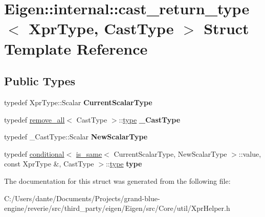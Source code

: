 \hypertarget{struct_eigen_1_1internal_1_1cast__return__type}{}\section{Eigen\+::internal\+::cast\+\_\+return\+\_\+type$<$ Xpr\+Type, Cast\+Type $>$ Struct Template Reference}
\label{struct_eigen_1_1internal_1_1cast__return__type}
\subsection*{Public Types}
\begin{DoxyCompactItemize}
\item 
\mbox{\label{struct_eigen_1_1internal_1_1cast__return__type_a596724bf517968c8384b050916a1a076}} 
typedef Xpr\+Type\+::\+Scalar {\bfseries Current\+Scalar\+Type}
\item 
\mbox{\label{struct_eigen_1_1internal_1_1cast__return__type_a1c9077977303cecc13d0069f58624662}} 
typedef \mbox{\hyperlink{struct_eigen_1_1internal_1_1remove__all}{remove\+\_\+all}}$<$ Cast\+Type $>$\+::\mbox{\hyperlink{struct_eigen_1_1internal_1_1true__type}{type}} {\bfseries \+\_\+\+Cast\+Type}
\item 
\mbox{\label{struct_eigen_1_1internal_1_1cast__return__type_aa13fd8b2e8fe3a4cdfc25b4f0961cbec}} 
typedef \+\_\+\+Cast\+Type\+::\+Scalar {\bfseries New\+Scalar\+Type}
\item 
\mbox{\label{struct_eigen_1_1internal_1_1cast__return__type_a317bf470ba15bfe4cdfc28991ef8302c}} 
typedef \mbox{\hyperlink{struct_eigen_1_1internal_1_1conditional}{conditional}}$<$ \mbox{\hyperlink{struct_eigen_1_1internal_1_1is__same}{is\+\_\+same}}$<$ Current\+Scalar\+Type, New\+Scalar\+Type $>$\+::value, const Xpr\+Type \&, Cast\+Type $>$\+::\mbox{\hyperlink{struct_eigen_1_1internal_1_1true__type}{type}} {\bfseries type}
\end{DoxyCompactItemize}


The documentation for this struct was generated from the following file\+:\begin{DoxyCompactItemize}
\item 
C\+:/\+Users/dante/\+Documents/\+Projects/grand-\/blue-\/engine/reverie/src/third\+\_\+party/eigen/\+Eigen/src/\+Core/util/Xpr\+Helper.\+h\end{DoxyCompactItemize}
